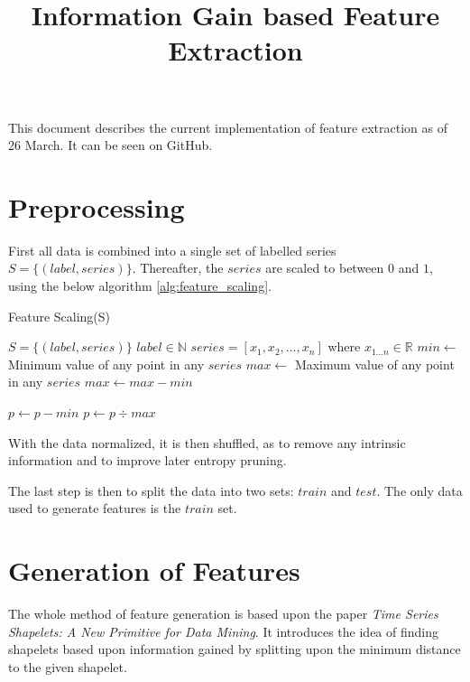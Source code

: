 \documentclass[10pt]{article}
\title{\textbf{Information Gain based Feature Extraction}}
\begin{document}
\maketitle
\thispagestyle{empty}

This document describes the current implementation of feature extraction as of 26 March. It can be seen on GitHub\cite{GitHub}.

\tableofcontents

\newpage
\section{Preprocessing}
First all data is combined into a single set of labelled series $S = \{(label, series)\}$. Thereafter, the $series$ are scaled to between $0$ and $1$, using the below algorithm \ref{alg:feature_scaling}.

\begin{algorithm}
\caption{Feature Scaling(S)}\label{alg:feature_scaling}
\begin{algorithmic}
\Require $S = \{(label, series)\}$
\Require $label \in \mathbb{N}$
\Require $series = [x_1, x_2, ..., x_n]$ where $x_{1 ... n} \in \mathbb{R}$
\State $min \gets$ Minimum value of any point in any $series$
\State $max \gets$ Maximum value of any point in any $series$
\State $max \gets max - min$

			\State $p \gets p - min$
			\State $p \gets p \div max$
	\EndFor
\EndFor

\end{algorithmic}
\end{algorithm}

With the data normalized, it is then shuffled, as to remove any intrinsic information and to improve later entropy pruning.
\newline

The last step is then to split the data into two sets: $train$ and $test$. The only data used to generate features is the $train$ set.

\section{Generation of Features}
The whole method of feature generation is based upon the paper \textit{Time Series Shapelets: A New Primitive for Data Mining}\cite{Shapelets}. It introduces the idea of finding shapelets based upon information gained by splitting upon the minimum distance to the given shapelet.
\newline
\end{document}
